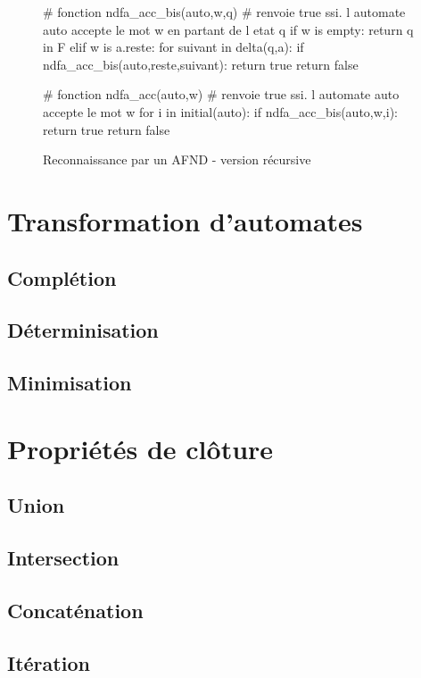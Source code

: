 \begin{figure}[!ht]
\begin{python}
# fonction ndfa_acc_bis(auto,w,q)
# renvoie true ssi. l automate auto accepte le mot w en partant de l etat q
if w is empty:
    return q in F
elif w is a.reste:
    for suivant in delta(q,a):
        if ndfa_acc_bis(auto,reste,suivant):
            return true
    return false


# fonction ndfa_acc(auto,w)
# renvoie true ssi. l automate auto accepte le mot w
for i in initial(auto):
    if ndfa_acc_bis(auto,w,i):
        return true
return false
\end{python}
\caption{Reconnaissance par un AFND - version récursive}
\end{figure}
\newpage

\section{Transformation d'automates}
\label{transauto}


\subsection{Complétion}

\subsection{Déterminisation}
\label{det}

\subsection{Minimisation}
\label{minim}

\section{Propriétés de clôture}
\label{cloture}
\subsection{Union}

\subsection{Intersection}

\subsection{Concaténation}

\subsection{Itération}

